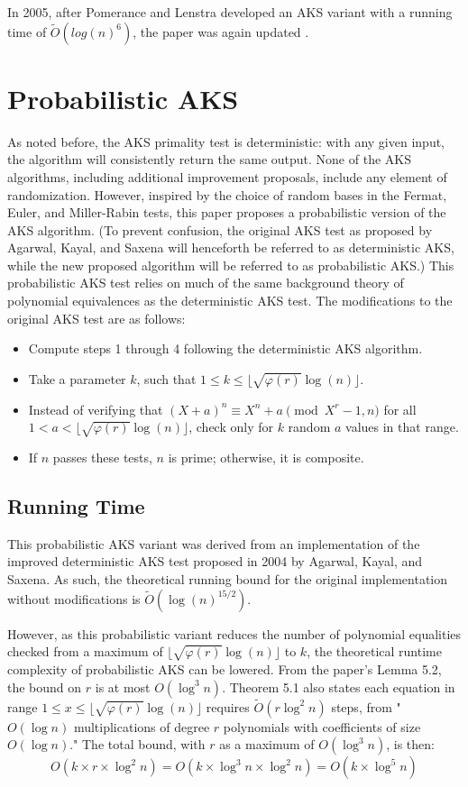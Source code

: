 \documentclass{article}
\begin{document}
In 2005, after Pomerance and Lenstra developed an AKS variant with a running time of $\widetilde{O}(log(n)^{6})$, the paper was again updated \cite{lenstra_jr._primality_2005}.

\section{Probabilistic AKS}
\label{paks}

As noted before, the AKS primality test is deterministic: with any given input, the algorithm will consistently return the same output. None of the AKS algorithms, including additional improvement proposals, include any element of randomization. However, inspired by the choice of random bases in the Fermat, Euler, and Miller-Rabin tests, this paper proposes a probabilistic version of the AKS algorithm. (To prevent confusion, the original AKS test as proposed by Agarwal, Kayal, and Saxena will henceforth be referred to as deterministic AKS, while the new proposed algorithm will be referred to as probabilistic AKS.) This probabilistic AKS test relies on much of the same background theory of polynomial equivalences as the deterministic AKS test. The modifications to the original AKS test are as follows:

\begin{itemize}
    \item Compute steps 1 through 4 following the deterministic AKS algorithm.
    \item Take a parameter $k$, such that $1 \leq k \leq \lfloor \sqrt{\varphi(r)}\log(n) \rfloor$.
    \item Instead of verifying that $(X + a)^n \equiv X^n + a \pmod{X^r - 1, n}$ for all $1 < a < \lfloor \sqrt{\varphi(r)}\log(n) \rfloor$, check only for $k$ random $a$ values in that range.
    \item If $n$ passes these tests, $n$ is prime; otherwise, it is composite.
\end{itemize}

\subsection{Running Time}
This probabilistic AKS variant was derived from an implementation of the improved deterministic AKS test proposed in 2004 by Agarwal, Kayal, and Saxena. As such, the theoretical running bound for the original implementation without modifications is $\widetilde{O}(\log(n)^{15/2})$.

However, as this probabilistic variant reduces the number of polynomial equalities checked from a maximum of $\lfloor \sqrt{\varphi(r)}\log(n) \rfloor$ to $k$, the theoretical runtime complexity of probabilistic AKS can be lowered. From the paper's Lemma 5.2, the bound on $r$ is at most $O(\log^3{n})$. Theorem 5.1 also states each equation in range $1 \leq x \leq \lfloor \sqrt{\varphi(r)}\log(n) \rfloor$ requires $\widetilde{O}(r \log^2{n})$ steps, from "$O(\log{n})$ multiplications of degree $r$ polynomials with coefficients of size $O(\log{n})$." The total bound, with $r$ as a maximum of $O(\log^3{n})$, is then:
\[O(k \times r \times \log^2{n}) = O(k \times \log^3{n} \times \log^2{n}) = O(k \times \log^5{n})\]
\end{document}

